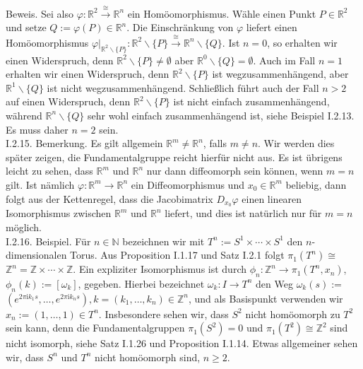 \documentclass[10pt, letterpaper]{article}
\begin{document}
Beweis. Sei also $\varphi: \mathbb{R}^{2} \xrightarrow{\cong} \mathbb{R}^{n}$ ein Homöomorphismus. Wähle einen Punkt $P \in \mathbb{R}^{2}$ und setze $Q:=\varphi(P) \in \mathbb{R}^{n}$. Die Einschränkung von $\varphi$ liefert einen Homöomorphismus $\left.\varphi\right|_{\mathbb{R}^{2} \backslash\{P\}}: \mathbb{R}^{2} \backslash\{P\} \xrightarrow{\cong} \mathbb{R}^{n} \backslash\{Q\}$. Ist $n=0$, so erhalten wir einen Widerspruch, denn $\mathbb{R}^{2} \backslash\{P\} \neq \emptyset$ aber $\mathbb{R}^{0} \backslash\{Q\}=\emptyset$. Auch im Fall $n=1$ erhalten wir einen Widerspruch, denn $\mathbb{R}^{2} \backslash\{P\}$ ist wegzusammenhängend, aber $\mathbb{R}^{1} \backslash\{Q\}$ ist nicht wegzusammenhängend. Schließlich führt auch der Fall $n>2$ auf einen Widerspruch, denn $\mathbb{R}^{2} \backslash\{P\}$ ist nicht einfach zusammenhängend, während $\mathbb{R}^{n} \backslash\{Q\}$ sehr wohl einfach zusammenhängend ist, siehe Beispiel I.2.13. Es muss daher $n=2$ sein.\\
I.2.15. Bemerkung. Es gilt allgemein $\mathbb{R}^{m} \neq \mathbb{R}^{n}$, falls $m \neq n$. Wir werden dies später zeigen, die Fundamentalgruppe reicht hierfür nicht aus. Es ist übrigens leicht zu sehen, dass $\mathbb{R}^{m}$ und $\mathbb{R}^{n}$ nur dann diffeomorph sein können, wenn $m=n$ gilt. Ist nämlich $\varphi: \mathbb{R}^{m} \rightarrow \mathbb{R}^{n}$ ein Diffeomorphismus und $x_{0} \in \mathbb{R}^{m}$ beliebig, dann folgt aus der Kettenregel, dass die Jacobimatrix $D_{x_{0}} \varphi$ einen linearen Isomorphismus zwischen $\mathbb{R}^{m}$ und $\mathbb{R}^{n}$ liefert, und dies ist natürlich nur für $m=n$ möglich.\\
I.2.16. Beispiel. Für $n \in \mathbb{N}$ bezeichnen wir mit $T^{n}:=S^{1} \times \cdots \times S^{1}$ den $n$-dimensionalen Torus. Aus Proposition I.1.17 und Satz I.2.1 folgt $\pi_{1}\left(T^{n}\right) \cong$ $\mathbb{Z}^{n}=\mathbb{Z} \times \cdots \times \mathbb{Z}$. Ein expliziter Isomorphismus ist durch $\phi_{n}: \mathbb{Z}^{n} \rightarrow \pi_{1}\left(T^{n}, x_{n}\right)$, $\phi_{n}(k):=\left[\omega_{k}\right]$, gegeben. Hierbei bezeichnet $\omega_{k}: I \rightarrow T^{n}$ den Weg $\omega_{k}(s):=$ $\left(e^{2 \pi \mathrm{i} k_{1} s}, \ldots, e^{2 \pi \mathrm{i} k_{n} s}\right), k=\left(k_{1}, \ldots, k_{n}\right) \in \mathbb{Z}^{n}$, und als Basispunkt verwenden wir $x_{n}:=(1, \ldots, 1) \in T^{n}$. Insbesondere sehen wir, dass $S^{2}$ nicht homöomorph zu $T^{2}$ sein kann, denn die Fundamentalgruppen $\pi_{1}\left(S^{2}\right)=0$ und $\pi_{1}\left(T^{2}\right) \cong \mathbb{Z}^{2}$ sind nicht isomorph, siehe Satz I.1.26 und Proposition I.1.14. Etwas allgemeiner sehen wir, dass $S^{n}$ und $T^{n}$ nicht homöomorph sind, $n \geq 2$.\\
\end{document}
